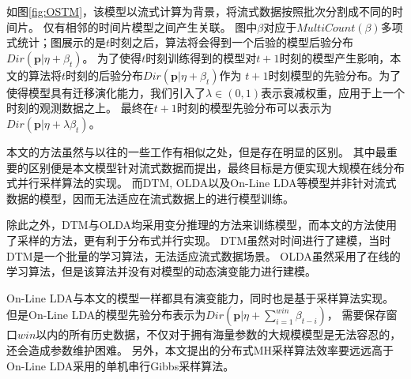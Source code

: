 如图\ref{fig:OSTM}，该模型以流式计算为背景，将流式数据按照批次分割成不同的时间片。
仅有相邻的时间片模型之间产生关联。
图中$\beta$对应于$MultiCount(\beta)$多项式统计；图展示的是$t$时刻之后，算法将会得到一个后验的模型后验分布$Dir(\mathbf{p} | \eta + \beta_t)$。
为了使得$t$时刻训练得到的模型对$t+1$时刻的模型产生影响，本文的算法将$t$时刻的后验分布$Dir(\mathbf{p} | \eta + \beta_t )$作为
$t+1$时刻模型的先验分布。为了使得模型具有迁移演化能力，我们引入了$\lambda \in (0, 1)$表示衰减权重，应用于上一个时刻的观测数据之上。
最终在$t+1$时刻的模型先验分布可以表示为$Dir(\mathbf{p} | \eta + \lambda \beta_t )$。

本文的方法虽然与以往的一些工作有相似之处，但是存在明显的区别。
其中最重要的区别便是本文模型针对流式数据而提出，最终目标是方便实现大规模在线分布式并行采样算法的实现。
而DTM, OLDA以及On-Line LDA等模型并非针对流式数据的模型，因而无法适应在流式数据上的进行模型训练。

除此之外，DTM与OLDA均采用变分推理的方法来训练模型，而本文的方法使用了采样的方法，更有利于分布式并行实现。
DTM虽然对时间进行了建模，当时DTM是一个批量的学习算法，无法适应流式数据场景。
OLDA虽然采用了在线的学习算法，但是该算法并没有对模型的动态演变能力进行建模。

On-Line LDA与本文的模型一样都具有演变能力，同时也是基于采样算法实现。
但是On-Line LDA的模型先验分布表示为$Dir(\mathbf{p} | \eta + \sum_{i=1}^{win}{\beta_{t-i}} )$，
需要保存窗口$win$以内的所有历史数据，不仅对于拥有海量参数的大规模模型是无法容忍的，还会造成参数维护困难。
另外，本文提出的分布式MH采样算法效率要远远高于On-Line LDA采用的单机串行Gibbs采样算法。

